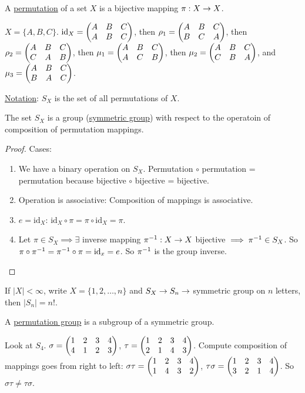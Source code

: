 \documentclass[]{article}
\begin{document}
\begin{definition}
	A \ul{permutation} of a set $X$ is a bijective mapping $\pi: X\rightarrow X$.
\end{definition}
\begin{example}
	$X = \{A,B,C\}$. $\text{id}_X = \begin{pmatrix}A&B&C\\A&B&C\end{pmatrix}$, then $\rho_1 = \begin{pmatrix}A&B&C \\ B&C&A\end{pmatrix}$, then $\rho_2 = \begin{pmatrix}A&B&C\\C&A&B\end{pmatrix}$, then $\mu_1 = \begin{pmatrix}A&B&C\\A&C&B\end{pmatrix}$, then $\mu_2 = \begin{pmatrix}A&B&C\\C&B&A\end{pmatrix}$, and $\mu_3 = \begin{pmatrix}A&B&C\\B&A&C\end{pmatrix}$.
\end{example}
\ul{Notation}: $S_X$ is the set of all permutations of $X$.

\begin{theorem}
	The set $S_X$ is a group (\ul{symmetric group}) with respect to the operatoin of composition of permutation mappings.
\end{theorem}
\begin{proof}
	Cases:
	\begin{enumerate}
		\item We have a binary operation on $S_X$. Permutation $\circ$ permutation = permutation because bijective $\circ$ bijective = bijective.
		\item Operation is associative: Composition of mappings is associative.
		\item $e = \text{id}_X$: $\text{id}_X \circ \pi = \pi\circ \text{id}_X = \pi$.
		\item Let $\pi\in S_X \implies \exists$ inverse mapping $\pi^{-1}: X\rightarrow X$ bijective $\implies \pi^{-1}\in S_X$. So $\pi\circ\pi^{-1} = \pi^{-1}\circ\pi = \text{id}_x = e$. So $\pi^{-1}$ is the group inverse.
	\end{enumerate}
\end{proof}

If $|X|<\infty$, write $X = \{1,2,\dots,n\}$ and $S_X\rightarrow S_n \rightarrow$ symmetric group on $n$ letters, then $|S_n| = n!$.

\begin{definition}
	A \ul{permutation group} is a subgroup of a symmetric group.
\end{definition}
\begin{example}
	Look at $S_4$. $\sigma = \begin{pmatrix}1&2&3&4\\4&1&2&3\end{pmatrix}$, $\tau = \begin{pmatrix}1&2&3&4 \\ 2&1&4&3\end{pmatrix}$. Compute composition of mappings goes from right to left: $\sigma \tau  = \begin{pmatrix}1&2&3&4\\1&4&3&2\end{pmatrix}$, $\tau\sigma = \begin{pmatrix}1&2&3&4\\3&2&1&4\end{pmatrix}$. So $\sigma\tau \neq \tau\sigma$.
\end{example}
\end{document}
